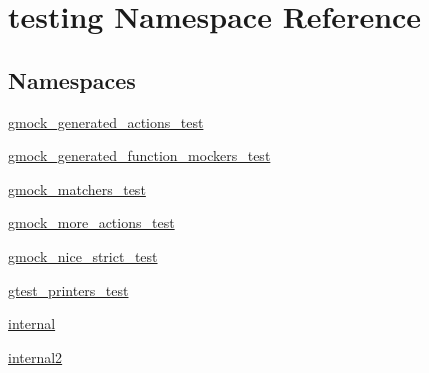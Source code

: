 \hypertarget{namespacetesting}{}\section{testing Namespace Reference}
\label{namespacetesting}
\subsection*{Namespaces}
\begin{DoxyCompactItemize}
\item 
 \hyperlink{namespacetesting_1_1gmock__generated__actions__test}{gmock\+\_\+generated\+\_\+actions\+\_\+test}
\item 
 \hyperlink{namespacetesting_1_1gmock__generated__function__mockers__test}{gmock\+\_\+generated\+\_\+function\+\_\+mockers\+\_\+test}
\item 
 \hyperlink{namespacetesting_1_1gmock__matchers__test}{gmock\+\_\+matchers\+\_\+test}
\item 
 \hyperlink{namespacetesting_1_1gmock__more__actions__test}{gmock\+\_\+more\+\_\+actions\+\_\+test}
\item 
 \hyperlink{namespacetesting_1_1gmock__nice__strict__test}{gmock\+\_\+nice\+\_\+strict\+\_\+test}
\item 
 \hyperlink{namespacetesting_1_1gtest__printers__test}{gtest\+\_\+printers\+\_\+test}
\item 
 \hyperlink{namespacetesting_1_1internal}{internal}
\item 
 \hyperlink{namespacetesting_1_1internal2}{internal2}
\end{DoxyCompactItemize}
